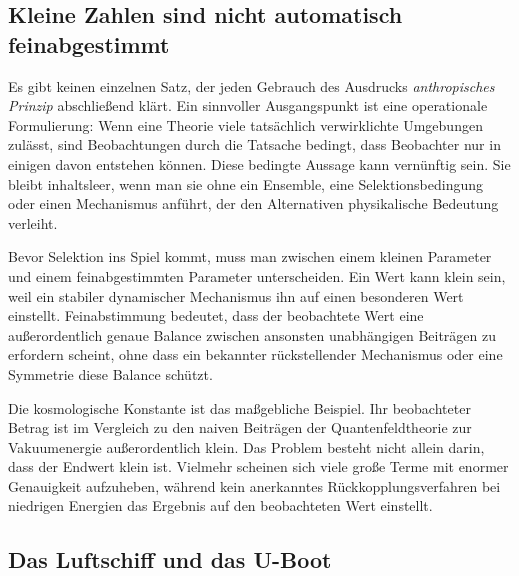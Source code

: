 \subsection{Kleine Zahlen sind nicht automatisch feinabgestimmt}

Es gibt keinen einzelnen Satz, der jeden Gebrauch des Ausdrucks \emph{anthropisches Prinzip} abschließend klärt. Ein sinnvoller Ausgangspunkt ist eine operationale Formulierung: Wenn eine Theorie viele tatsächlich verwirklichte Umgebungen zulässt, sind Beobachtungen durch die Tatsache bedingt, dass Beobachter nur in einigen davon entstehen können. Diese bedingte Aussage kann vernünftig sein. Sie bleibt inhaltsleer, wenn man sie ohne ein Ensemble, eine Selektionsbedingung oder einen Mechanismus anführt, der den Alternativen physikalische Bedeutung verleiht.

Bevor Selektion ins Spiel kommt, muss man zwischen einem kleinen Parameter und einem feinabgestimmten Parameter unterscheiden. Ein Wert kann klein sein, weil ein stabiler dynamischer Mechanismus ihn auf einen besonderen Wert einstellt. Feinabstimmung bedeutet, dass der beobachtete Wert eine außerordentlich genaue Balance zwischen ansonsten unabhängigen Beiträgen zu erfordern scheint, ohne dass ein bekannter rückstellender Mechanismus oder eine Symmetrie diese Balance schützt.

\begin{classroomqa}
\end{classroomqa}

Die kosmologische Konstante ist das maßgebliche Beispiel. Ihr beobachteter Betrag ist im Vergleich zu den naiven Beiträgen der Quantenfeldtheorie zur Vakuumenergie außerordentlich klein. Das Problem besteht nicht allein darin, dass der Endwert klein ist. Vielmehr scheinen sich viele große Terme mit enormer Genauigkeit aufzuheben, während kein anerkanntes Rückkopplungsverfahren bei niedrigen Energien das Ergebnis auf den beobachteten Wert einstellt.

\subsection{Das Luftschiff und das U-Boot}

